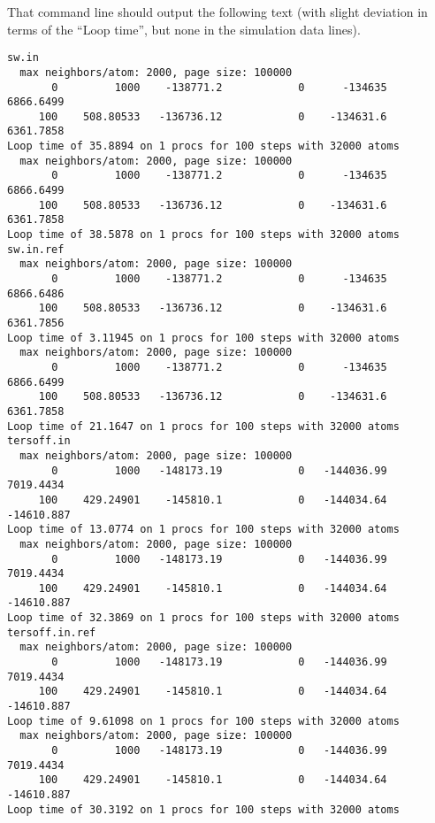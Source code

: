 \documentclass[sigconf]{acmart}
\begin{document}
That command line should output the following text (with slight deviation in terms of the ``Loop time'', but none in the simulation data lines).

\begin{verbatim}
sw.in
  max neighbors/atom: 2000, page size: 100000
       0         1000    -138771.2            0      -134635    6866.6499 
     100    508.80533   -136736.12            0    -134631.6    6361.7858 
Loop time of 35.8894 on 1 procs for 100 steps with 32000 atoms
  max neighbors/atom: 2000, page size: 100000
       0         1000    -138771.2            0      -134635    6866.6499 
     100    508.80533   -136736.12            0    -134631.6    6361.7858 
Loop time of 38.5878 on 1 procs for 100 steps with 32000 atoms
sw.in.ref
  max neighbors/atom: 2000, page size: 100000
       0         1000    -138771.2            0      -134635    6866.6486 
     100    508.80533   -136736.12            0    -134631.6    6361.7856 
Loop time of 3.11945 on 1 procs for 100 steps with 32000 atoms
  max neighbors/atom: 2000, page size: 100000
       0         1000    -138771.2            0      -134635    6866.6499 
     100    508.80533   -136736.12            0    -134631.6    6361.7858 
Loop time of 21.1647 on 1 procs for 100 steps with 32000 atoms
tersoff.in
  max neighbors/atom: 2000, page size: 100000
       0         1000   -148173.19            0   -144036.99    7019.4434 
     100    429.24901    -145810.1            0   -144034.64   -14610.887 
Loop time of 13.0774 on 1 procs for 100 steps with 32000 atoms
  max neighbors/atom: 2000, page size: 100000
       0         1000   -148173.19            0   -144036.99    7019.4434 
     100    429.24901    -145810.1            0   -144034.64   -14610.887 
Loop time of 32.3869 on 1 procs for 100 steps with 32000 atoms
tersoff.in.ref
  max neighbors/atom: 2000, page size: 100000
       0         1000   -148173.19            0   -144036.99    7019.4434 
     100    429.24901    -145810.1            0   -144034.64   -14610.887 
Loop time of 9.61098 on 1 procs for 100 steps with 32000 atoms
  max neighbors/atom: 2000, page size: 100000
       0         1000   -148173.19            0   -144036.99    7019.4434 
     100    429.24901    -145810.1            0   -144034.64   -14610.887 
Loop time of 30.3192 on 1 procs for 100 steps with 32000 atoms
\end{verbatim}
\end{document}

